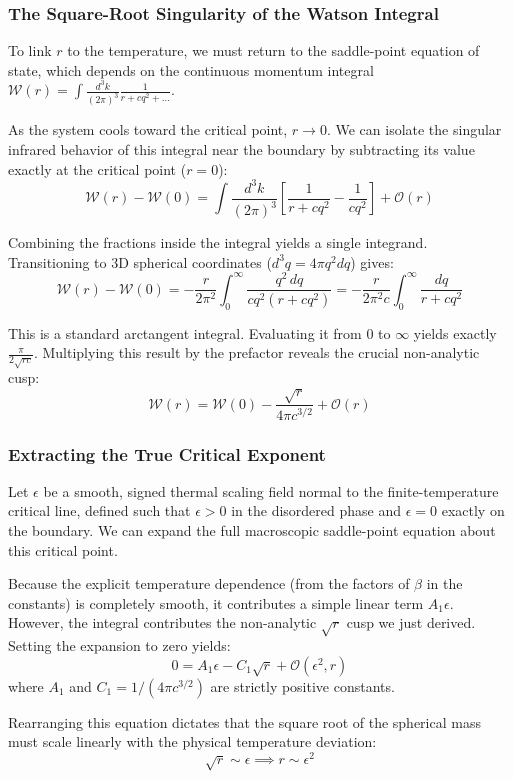 \documentclass[11pt,a4paper]{article}
\newcommand{\dk}{\frac{d^3k}{(2\pi)^3}}
\newcommand{\Wc}{\mathcal{W}}
\newcommand{\dk}{\frac{d^3k}{(2\pi)^3}}
\newcommand{\Wc}{\mathcal{W}}
\begin{document}
\subsubsection*{The Square-Root Singularity of the Watson Integral}
To link $r$ to the temperature, we must return to the saddle-point equation of state, which depends on the continuous momentum integral $\Wc(r) = \int \dk \frac{1}{r + c q^2 + \dots}$.

As the system cools toward the critical point, $r \to 0$. We can isolate the singular infrared behavior of this integral near the boundary by subtracting its value exactly at the critical point ($r=0$):
$$\Wc(r) - \Wc(0) = \int \dk \left[ \frac{1}{r + c q^2} - \frac{1}{c q^2} \right] + \mathcal{O}(r)$$

Combining the fractions inside the integral yields a single integrand. Transitioning to 3D spherical coordinates ($d^3q = 4\pi q^2 dq$) gives:
$$\Wc(r) - \Wc(0) = -\frac{r}{2\pi^2} \int_0^\infty \frac{q^2 \, dq}{c q^2 (r + c q^2)} = -\frac{r}{2\pi^2 c} \int_0^\infty \frac{dq}{r + c q^2}$$

This is a standard arctangent integral. Evaluating it from $0$ to $\infty$ yields exactly $\frac{\pi}{2\sqrt{rc}}$. Multiplying this result by the prefactor reveals the crucial non-analytic cusp:
\begin{equation}
  \boxed{\ \Wc(r) = \Wc(0) - \frac{\sqrt{r}}{4\pi c^{3/2}} + \mathcal{O}(r)\ }
  \label{eq:watson}
\end{equation}

\subsubsection*{Extracting the True Critical Exponent}
Let $\epsilon$ be a smooth, signed thermal scaling field normal to the finite-temperature critical line, defined such that $\epsilon > 0$ in the disordered phase and $\epsilon = 0$ exactly on the boundary. We can expand the full macroscopic saddle-point equation about this critical point.

Because the explicit temperature dependence (from the factors of $\beta$ in the constants) is completely smooth, it contributes a simple linear term $A_1 \epsilon$. However, the integral contributes the non-analytic $\sqrt{r}$ cusp we just derived. Setting the expansion to zero yields:
$$0 = A_1 \epsilon - C_1 \sqrt{r} + \mathcal{O}(\epsilon^2, r)$$
where $A_1$ and $C_1 = 1 / (4\pi c^{3/2})$ are strictly positive constants.

Rearranging this equation dictates that the square root of the spherical mass must scale linearly with the physical temperature deviation:
$$\sqrt{r} \sim \epsilon \implies r \sim \epsilon^2$$
\end{document}
